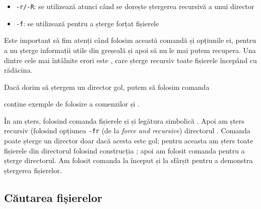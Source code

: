 \begin{itemize}
  \item \texttt{-r/-R}: se utilizează atunci când se dorește ștergerea recursivă a unui director
  \item \texttt{-f}: se utilizează pentru a șterge forțat fișierele
\end{itemize}

Este important să fim atenți când folosim această comandă și opțiunile ei, pentru a nu șterge informații utile din greșeală și apoi să nu le mai putem recupera. Una dintre cele mai întâlnite erori este , care șterge recursiv toate fișierele începând cu rădăcina.

\begin{note}[Observație]
Dacă dorim să ștergem un director gol, putem să folosim comanda
\end{note}

 conține exemple de folosire a comenzilor  și .


În  am șters, folosind comanda  fișierele  și  și legătura simbolică . Apoi am șters recursiv (folosind opțiunea \texttt{-fr} (de la \textit{force and recursive}) directorul . Comanda  poate șterge un director doar dacă acesta este gol; pentru aceasta am șters toate fișierele din directorul  folosind construcția ; apoi am folosit comanda  pentru a șterge directorul. Am folosit comanda  la început și la sfârșit pentru a demonstra ștergerea fișierelor.

\subsection{Căutarea fișierelor}
\label{sec:fs:search}

